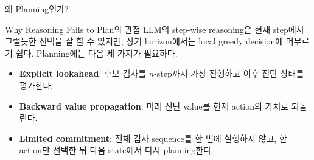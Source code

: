 \documentclass[
11pt,notheorems,hyperref={pdfauthor=whatever}
]{beamer}
\newcommand{\term}[1]{\textbf{\textcolor{DeepBlue}{#1}}}
\begin{document}
\begin{frame}{왜 Planning인가?}
\vspace{0.2em}
\begin{block}{Why Reasoning Fails to Plan의 관점}
\small
LLM의 step-wise reasoning은 현재 step에서 그럴듯한 선택을 잘 할 수 있지만, 장기 horizon에서는 local greedy decision에 머무르기 쉽다. Planning에는 다음 세 가지가 필요하다.
\end{block}

\vspace{0.25em}
\begin{center}
\end{center}

\vspace{0.35em}
\scriptsize
\begin{itemize}
  \item \term{Explicit lookahead}: 후보 검사를 \(n\)-step까지 가상 진행하고 이후 진단 상태를 평가한다.
  \item \term{Backward value propagation}: 미래 진단 value를 현재 action의 가치로 되돌린다.
  \item \term{Limited commitment}: 전체 검사 sequence를 한 번에 실행하지 않고, 한 action만 선택한 뒤 다음 state에서 다시 planning한다.
\end{itemize}
\end{frame}
\end{document}
